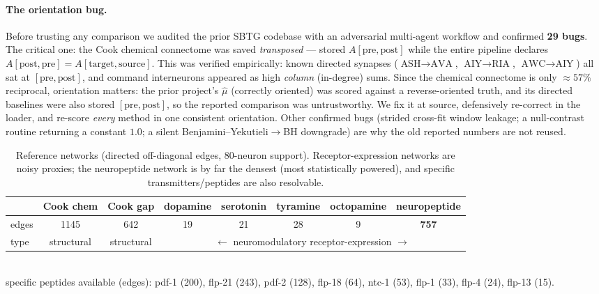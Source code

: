 \documentclass[11pt]{article}
\begin{document}
\paragraph{The orientation bug.} Before trusting any comparison we audited the prior SBTG codebase
with an adversarial multi-agent workflow and confirmed \textbf{29 bugs}. The critical one: the Cook
chemical connectome was saved \emph{transposed} --- stored $A[\text{pre},\text{post}]$ while the
entire pipeline declares $A[\text{post},\text{pre}]=A[\text{target},\text{source}]$. This was verified
empirically: known directed synapses ($\text{ASH}\!\to\!\text{AVA}$, $\text{AIY}\!\to\!\text{RIA}$,
$\text{AWC}\!\to\!\text{AIY}$) all sat at $[\text{pre},\text{post}]$, and command interneurons appeared
as high \emph{column} (in-degree) sums. Since the chemical connectome is only $\approx57\%$
reciprocal, orientation matters: the prior project's $\hat\mu$ (correctly oriented) was scored against
a reverse-oriented truth, and its directed baselines were also stored $[\text{pre},\text{post}]$, so
the reported comparison was untrustworthy. We fix it at source, defensively re-correct in the loader,
and re-score \emph{every} method in one consistent orientation. Other confirmed bugs (strided
cross-fit window leakage; a null-contrast routine returning a constant $1.0$; a silent
Benjamini--Yekutieli$\to$BH downgrade) are why the old reported numbers are not reused.

\begin{table}[t]
\centering
\small
\caption{Reference networks (directed off-diagonal edges, 80-neuron support). Receptor-expression
networks are noisy proxies; the neuropeptide network is by far the densest (most statistically
powered), and specific transmitters/peptides are also resolvable.}
\label{tab:refs}
\begin{tabular}{lccccccc}
\toprule
& Cook chem & Cook gap & dopamine & serotonin & tyramine & octopamine & neuropeptide \\
\midrule
edges & 1145 & 642 & 19 & 21 & 28 & 9 & \textbf{757} \\
type & structural & structural & \multicolumn{5}{c}{$\longleftarrow$ neuromodulatory receptor-expression $\longrightarrow$} \\
\bottomrule
\end{tabular}\\[2pt]
\footnotesize specific peptides available (edges): pdf-1 (200), flp-21 (243), pdf-2 (128), flp-18 (64),
ntc-1 (53), flp-1 (33), flp-4 (24), flp-13 (15).
\end{table}
\end{document}
